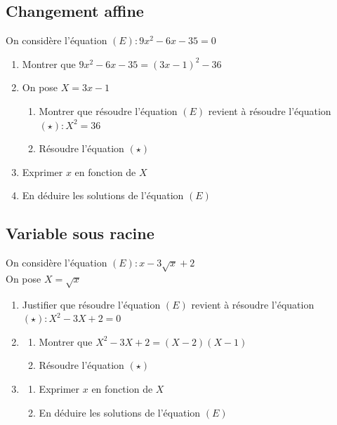 \documentclass[oneside,12pt]{article}          %
\begin{document}
\subsection{Changement affine}
On considère l'équation $(E):9x^2-6x-35=0$
\begin{enumerate}
	\item Montrer que $9x^2-6x-35=(3x-1)^2-36$
	\item On pose $X=3x-1$
	\begin{enumerate}
		\item Montrer que résoudre l'équation $(E)$ revient à résoudre l'équation $(\star):X^2=36$
		\item Résoudre l'équation $(\star)$
	\end{enumerate}
	\item Exprimer $x$ en fonction de $X$
	\item En déduire les solutions de l'équation $(E)$
\end{enumerate}



\subsection{Variable sous racine}
On considère l'équation $(E):x-3\sqrt{x}+2$ \\
On pose $X=\sqrt{x}$
\begin{enumerate}
	\item Justifier que résoudre l'équation $(E)$ revient à résoudre l'équation $(\star):X^2-3X+2=0$
	\item \begin{enumerate}
		\item Montrer que $X^2-3X+2=(X-2)(X-1)$
		\item Résoudre l'équation $(\star)$
	\end{enumerate}
	\item \begin{enumerate}
		\item Exprimer $x$ en fonction de $X$
		\item En déduire les solutions de l'équation $(E)$
	\end{enumerate}
\end{enumerate}
\end{document}
